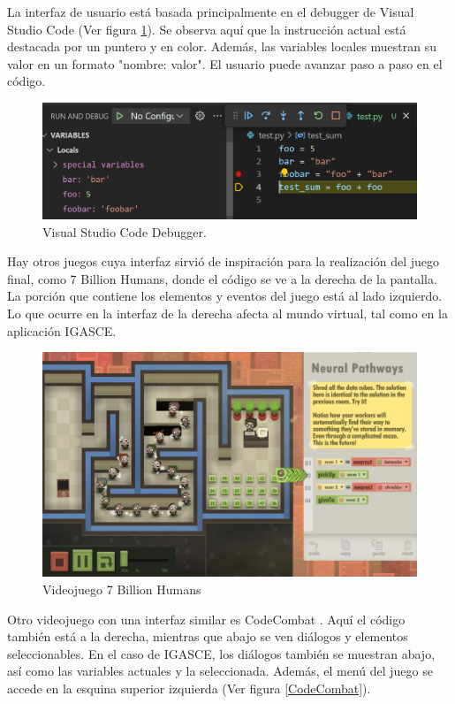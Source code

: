 La interfaz de usuario está basada principalmente en el debugger de Visual Studio Code \cite{vscode} (Ver figura \ref{VScodeDebugger}). Se observa aquí que la instrucción actual está destacada por un puntero y en color. Además, las variables locales muestran su valor en un formato "nombre: valor". El usuario puede avanzar paso a paso en el código.

\begin{figure}[h]
	\centering
	\includegraphics[scale=0.3]{imagenes/VScodeDebugger.png}
	\caption{Visual Studio Code Debugger.}
	\label{VScodeDebugger}
\end{figure}

Hay otros juegos cuya interfaz sirvió de inspiración para la realización del juego final, como 7 Billion Humans\cite{7billionhumans}, donde el código se ve a la derecha de la pantalla. La porción que contiene los elementos y eventos del juego está al lado izquierdo. Lo que ocurre en la interfaz de la derecha afecta al mundo virtual, tal como en la aplicación IGASCE.

\begin{figure}[h]
	\centering
	\includegraphics[scale=0.3]{imagenes/7BillionHumans.png}
	\caption{Videojuego 7 Billion Humans}
	\label{7BillionHumans}
\end{figure}


Otro videojuego con una interfaz similar es CodeCombat \cite{CodeCombat}. Aquí el código también está a la derecha, mientras que abajo se ven diálogos y elementos seleccionables. En el caso de IGASCE, los diálogos también se muestran abajo, así como las variables actuales y la seleccionada.
Además, el menú del juego se accede en la esquina superior izquierda (Ver figura \ref{CodeCombat}).

